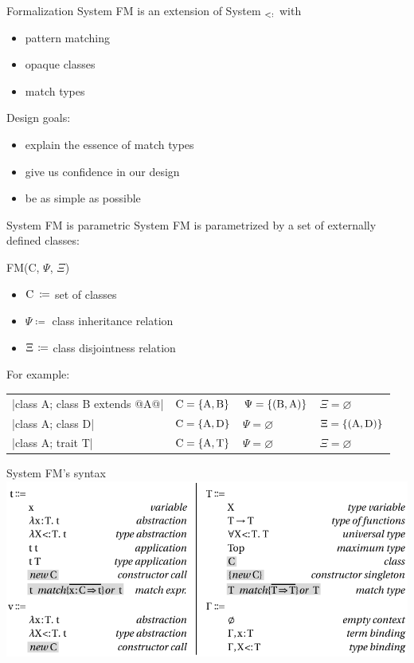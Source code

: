 \documentclass[10pt]{beamer}
\newenvironment{slide}[2][]
  {\begin{frame}[fragile,environment=slide,#1]{#2}}
  {\end{frame}}
\def\A{\normalfont\text{A}}
\def\B{\normalfont\text{B}}
\def\C{\normalfont\text{C}}
\def\D{\normalfont\text{D}}
\def\T{\normalfont\text{T}}
\def\<:{\allowbreak\operatorname{\normalfont\text{<}:}\allowbreak}
\def\Fsub{\normalfont{F}\ensuremath{_{\<:}}\xspace}
\newcommand{\tp}[1]{\color{typeColor}#1}
\begin{document}
\begin{slide}{Formalization}
System FM is an extension of System \Fsub with
\begin{itemize}
  \item pattern matching
  \item opaque classes
  \item match types
\end{itemize}
\pause
Design goals:
\begin{itemize}
  \item explain the essence of match types
  \item give us confidence in our design
  \item be as simple as possible
\end{itemize}
\end{slide}

\begin{slide}{System FM is parametric}
System FM is parametrized by a set of externally defined classes:

FM(C, $\Psi$, $\Xi$)
\begin{itemize}
  \item $\C \hspace{2.3pt} \coloneqq$ set of classes
  \item $\Psi \coloneqq$ class inheritance relation
  \item $\Xi \hspace{1.1pt} \coloneqq$ class disjointness relation
\end{itemize}
\pause
For example:

\begin{tabular}{@{}llll@{}}
|class A; class B extends @\tp{A}@| &$\C = \{\A, \B\}$ & $\Psi = \{(\B, \A)\}$ & $\Xi = \varnothing$\\
|class A; class D| &$\C = \{\A, \D\}$ & $\Psi = \varnothing$  & $\Xi = \{(\A, \D)\}$\\
|class A; trait T| &$\C = \{\A, \T\}$ & $\Psi = \varnothing$  & $\Xi = \varnothing$\\
\end{tabular}
\end{slide}

\begin{slide}{System FM's syntax}
\includegraphics[width=\textwidth]{figures/FMSyntax.pdf}
\end{slide}
\end{document}
